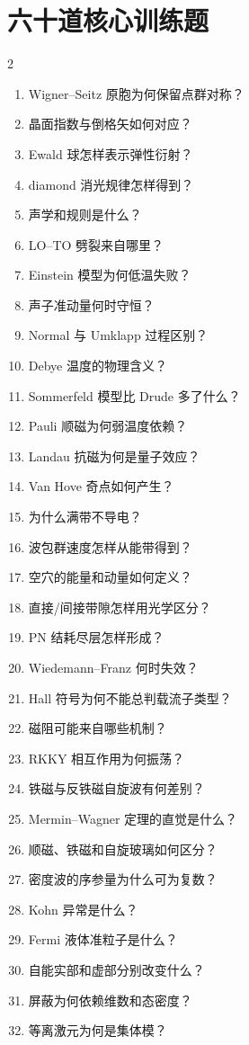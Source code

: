 \section{六十道核心训练题}
\begin{multicols}{2}
\begin{enumerate}
\item Wigner--Seitz 原胞为何保留点群对称？
\item 晶面指数与倒格矢如何对应？
\item Ewald 球怎样表示弹性衍射？
\item diamond 消光规律怎样得到？
\item 声学和规则是什么？
\item LO--TO 劈裂来自哪里？
\item Einstein 模型为何低温失败？
\item 声子准动量何时守恒？
\item Normal 与 Umklapp 过程区别？
\item Debye 温度的物理含义？
\item Sommerfeld 模型比 Drude 多了什么？
\item Pauli 顺磁为何弱温度依赖？
\item Landau 抗磁为何是量子效应？
\item Van Hove 奇点如何产生？
\item 为什么满带不导电？
\item 波包群速度怎样从能带得到？
\item 空穴的能量和动量如何定义？
\item 直接/间接带隙怎样用光学区分？
\item PN 结耗尽层怎样形成？
\item Wiedemann--Franz 何时失效？
\item Hall 符号为何不能总判载流子类型？
\item 磁阻可能来自哪些机制？
\item RKKY 相互作用为何振荡？
\item 铁磁与反铁磁自旋波有何差别？
\item Mermin--Wagner 定理的直觉是什么？
\item 顺磁、铁磁和自旋玻璃如何区分？
\item 密度波的序参量为什么可为复数？
\item Kohn 异常是什么？
\item Fermi 液体准粒子是什么？
\item 自能实部和虚部分别改变什么？
\item 屏蔽为何依赖维数和态密度？
\item 等离激元为何是集体模？

\end{enumerate}
\end{multicols}
